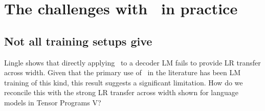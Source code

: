 \section{The challenges with \mup\ in practice} \label{sec:the_challenges_with_mup_in_practice}



\subsection{Not all training setups give \mut} \label{sec:challenges:mut}

Lingle \citep{Exploration_Of_Mu_Transfer} shows that directly applying \mup\ to a decoder LM fails to provide LR transfer across width. Given that the primary use of \mup\ in the literature has been LM training of this kind, this result suggests a significant limitation. How do we reconcile this with the strong LR transfer across width shown for language models in Tensor Programs V?



